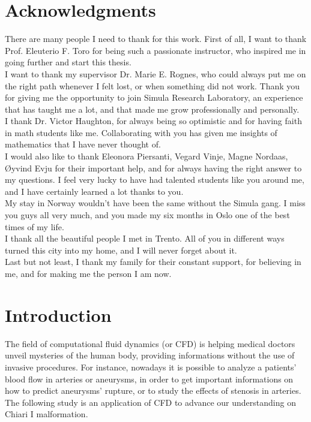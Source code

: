 \documentclass[a4paper,11pt,openright,twoside]{book}
\begin{document}
\chapter*{\LARGE Acknowledgments}
There are many people I need to thank for this work. First of all, I want to thank Prof. Eleuterio F. Toro for being such a passionate instructor, who inspired me in going further and start this thesis. \\
I want to thank my supervisor Dr. Marie E. Rognes, who could always put me on the right path whenever I felt lost, or when something did not work. Thank you for giving me the opportunity to join Simula Research Laboratory, an experience that has taught me a lot, and that made me grow professionally and personally. \\
I thank Dr. Victor Haughton, for always being so optimistic and for having faith in math students like me. Collaborating with you has given me insights of mathematics that I have never thought of. \\

I would also like to thank Eleonora Piersanti, Vegard Vinje, Magne Nordaas, Øyvind Evju for their important help, and for always having the right answer to my questions. I feel very lucky to have had talented students like you around me, and I have certainly learned a lot thanks to you. \\

My stay in Norway  wouldn't have been the same without the Simula gang. I miss you guys all very much, and you made my six months in Oslo one of the best times of my life. \\
I thank all the beautiful people I met in Trento. All of you in different ways turned this city into my home, and I will never forget about it. \\
Last but not least, I thank my family for their constant support, for believing in me, and for making me the person I am now.

\newpage




\newpage
\tableofcontents


\newpage
{}

\chapter{Introduction}
The field of computational fluid dynamics (or CFD) is helping medical doctors unveil mysteries of the human body, providing informations without the use of invasive procedures. For instance, nowadays it is possible to analyze a patients' blood flow in arteries or aneurysms, in order to get important informations on how to predict  aneurysms' rupture, or to study the effects of stenosis in arteries. The following study is an application of CFD to advance our understanding on Chiari I malformation.
\end{document}
